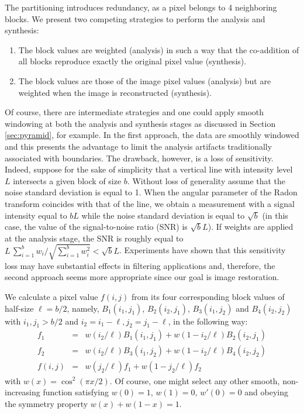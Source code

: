 The partitioning introduces redundancy, as a pixel belongs to 4
neighboring blocks. We present two competing strategies to perform the
analysis and synthesis:
\begin{enumerate}
\item The block values are weighted (analysis) in such a way that the
      co-addition of all blocks reproduce exactly the original pixel value
      (synthesis).
\item The block values are those of the image pixel values (analysis)
      but are weighted when the image is reconstructed (synthesis).
\end{enumerate}
Of course, there are intermediate strategies and one could apply
smooth windowing at both the analysis and synthesis stages as discussed
in Section \ref{sec:pyramid}, for example. In the first approach, the
data are smoothly windowed and this presents the advantage to limit
the analysis artifacts traditionally associated with boundaries.  The
drawback, however, is a loss of sensitivity. Indeed, suppose for the
sake of simplicity that a vertical line with intensity level $L$
intersects a given block of size $b$. Without loss of generality
assume that the noise standard deviation is equal to 1. When the
angular parameter of the Radon transform coincides with that of the
line,
we obtain a measurement with a signal intensity equal to $b L$ while
the noise standard deviation is equal to $\sqrt{b}$ (in this case, the
value of the signal-to-noise ratio (SNR) is $\sqrt{b} L$). If weights
are applied at the analysis stage, the SNR is roughly equal to $L \,
\sum_{i=1}^b w_i/\sqrt{\sum_{i=1}^b w_i^2} < \sqrt{b} L$. Experiments
have shown that this sensitivity loss may have substantial effects
in filtering applications and, therefore, the second approach
seems more appropriate since our goal is image restoration.

We calculate a pixel value $f(i,j)$ from its four corresponding block
values of half-size $\ell = b/2$, namely, $B_1(i_1,j_1)$,
$B_2(i_2,j_1)$, $B_3(i_1,j_2)$ and $B_4(i_2,j_2)$ with $i_1, j_1 >
b/2$ and $i_2 = i_1 - \ell, j_2 = j_1- \ell$, in the following way:
\begin{eqnarray}
      f_1 &  = &  w(i_2/\ell) B_1(i_1,j_1) + w(1-i_2/\ell)
B_2(i_2,j_1)\nonumber \\
      f_2 &  = &  w(i_2/\ell) B_3(i_1,j_2) + w(1-i_2/\ell)
B_4(i_2,j_2)\nonumber \\
      f(i,j) &  = &  w(j_2/\ell) f_1 +  w(1-j_2/\ell) f_2
\end{eqnarray}
with $w(x) = \cos^2(\pi x/2)$.  Of course, one might select any other
smooth, non-increasing function satisfying $w(0) = 1$, $w(1) = 0$,
$w'(0) = 0$ and obeying the symmetry property $w(x) + w(1-x) = 1$.

